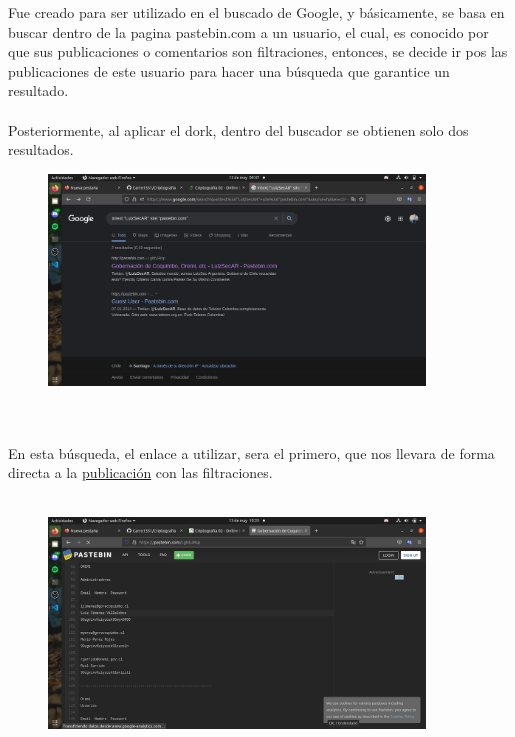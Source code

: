 \documentclass{article}
\begin{document}
    Fue creado para ser utilizado en el buscado de Google, y básicamente, se basa en buscar dentro de la pagina pastebin.com a un usuario, el cual, es conocido por que sus publicaciones o
    comentarios son filtraciones, entonces, se decide ir pos las publicaciones de este usuario para hacer una búsqueda que garantice
    un resultado. 
    \\\\
    Posteriormente, al aplicar el dork, dentro del buscador se obtienen solo dos resultados.
    \begin{figure}[h!]
        \centering
        \includegraphics[width=10cm ]{respuestadork.png}
    \end{figure}
    \\\\
    En esta búsqueda, el enlace a utilizar, sera el primero, que nos llevara de forma directa a la
    \href{https://pastebin.com/LgbbJRsp}{publicación}  con las filtraciones.
    \\\\
    \begin{figure}[h!]
        \centering
        \includegraphics[width=10cm]{leakspastebin.png}
    \end{figure}
\end{document}
